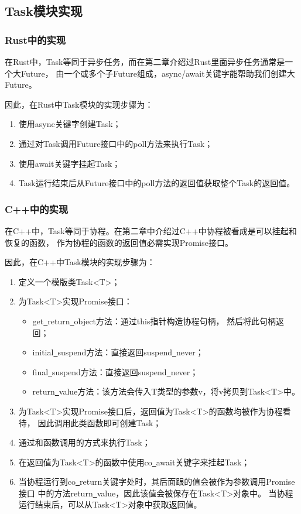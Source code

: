 \documentclass[supercite]{HustGraduPaper}
\theoremstyle{definition}
\begin{document}
\subsection{Task模块实现}

\subsubsection{Rust中的实现}

在Rust中，Task等同于异步任务，而在第二章介绍过Rust里面异步任务通常是一个大Future，
由一个或多个子Future组成，async/await关键字能帮助我们创建大Future。\par

因此，在Rust中Task模块的实现步骤为：

\begin{enumerate}
  \item 使用async关键字创建Task；
  \item 通过对Task调用Future接口中的poll方法来执行Task；
  \item 使用await关键字挂起Task；
  \item Task运行结束后从Future接口中的poll方法的返回值获取整个Task的返回值。
\end{enumerate}

\subsubsection{C++中的实现}

在C++中，Task等同于协程。在第二章中介绍过C++中协程被看成是可以挂起和恢复的函数，
作为协程的函数的返回值必需实现Promise接口。\par

因此，在C++中Task模块的实现步骤为：

\begin{enumerate}
  \item 定义一个模版类Task<T>；
  \item 为Task<T>实现Promise接口：
    \begin{itemize}
      \item get\underline{~}return\underline{~}object方法：通过this指针构造协程句柄，
        然后将此句柄返回；
      \item initial\underline{~}suspend方法：直接返回suspend\underline{~}never；
      \item final\underline{~}suspend方法：直接返回suspend\underline{~}never；
      \item return\underline{~}value方法：该方法会传入T类型的参数v，将v拷贝到Task<T>中。
    \end{itemize}
  \item 为Task<T>实现Promise接口后，返回值为Task<T>的函数均被作为协程看待，
    因此调用此类函数即可创建Task；
  \item 通过和函数调用的方式来执行Task；
  \item 在返回值为Task<T>的函数中使用co\underline{~}await关键字来挂起Task；
  \item 当协程运行到co\underline{~}return关键字处时，其后面跟的值会被作为参数调用Promise接口
    中的方法return\underline{~}value，因此该值会被保存在Task<T>对象中。
    当协程运行结束后，可以从Task<T>对象中获取返回值。
\end{enumerate}
\end{document}
